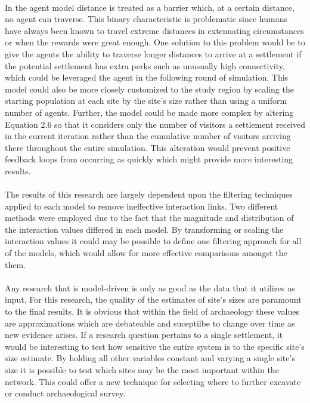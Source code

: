 \documentclass[12pt,a4paper]{thesis}
\begin{document}
\paragraph{}
In the agent model distance is treated as a barrier which, at a certain distance, no agent can traverse. This binary characteristic is problematic since humans have always been known to travel extreme distances in extenuating circumstances or when the rewards were great enough. One solution to this problem would be to give the agents the ability to traverse longer distances to arrive at a settlement if the potential settlement has extra perks such as unusually high connectivity, which could be leveraged the agent in the following round of simulation. This model could also be more closely customized to the study region by scaling the starting population at each site by the site's size rather than using a uniform number of agents. Further, the model could be made more complex by altering Equation 2.6 so that it considers only the number of visitors a settlement received in the current iteration rather than the cumulative number of visitors arriving there throughout the entire simulation. This alteration would prevent positive feedback loops from occurring as quickly which might provide more interesting results.

\paragraph{}
The results of this research are largely dependent upon the filtering techniques applied to each model to remove ineffective interaction links. Two different methods were employed due to the fact that the magnitude and distribution of the interaction values differed in each model. By transforming or scaling the interaction values it could may be possible to define one filtering approach for all of the models, which would allow for more effective comparisons amongst the them.    

\paragraph{}
Any research that is model-driven is only as good as the data that it utilizes as input. For this research, the quality of the estimates of site's sizes are paramount to the final results. It is obvious that within the field of archaeology these values are approximations which are debateable and suceptilbe to change over time as new evidence arises. If a research question pertains to a single settlement, it would be interesting to test how sensitive the entire system is to the specific site's size estimate. By holding all other variables constant and varying a single site's size it is possible to test which sites may be the most important within the network. This could offer a new technique for selecting where to further excavate or conduct archaeological survey. 
\end{document}
